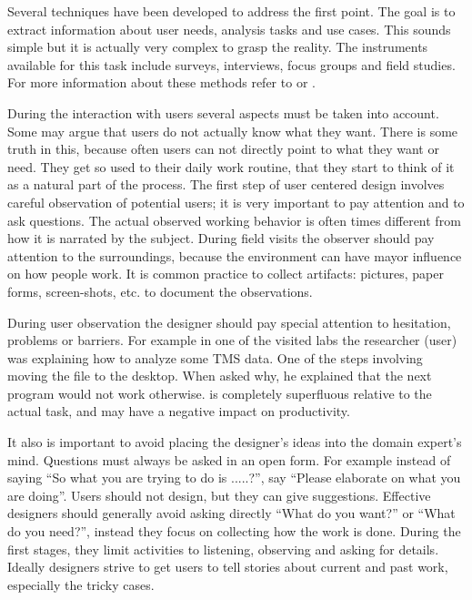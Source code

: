 Several techniques have been developed to address the first point. The goal is to extract information about user needs, analysis tasks and use cases. This sounds simple but it is actually very complex to grasp the reality. The instruments available for this task include surveys, interviews, focus groups and field studies. For more information about these methods refer to \autocite{baxter_understanding_2005} or \autocite{hartson_ux_2012}.

During the interaction with users several aspects must be taken into account.
Some may argue that users do not actually know what they want. There is some truth in this, because often users can not directly point to what they want or need. They get so used to their daily work routine, that they start to think of it as a natural part of the process. The first step of user centered design involves careful observation of potential users; it is very important to pay attention and to ask questions. The actual observed working behavior is often times different from how it is narrated by the subject. During field visits the observer should pay attention to the surroundings, because the environment can have mayor influence on how people work. It is common practice to collect artifacts: pictures, paper forms, screen-shots, etc. to document the observations.

During user observation the designer should pay special attention to hesitation, problems or barriers. For example in one of the visited labs the researcher (user) was explaining how to analyze some TMS data. One of the steps involving moving the file to the desktop. When asked  why, he explained that the next program would not work otherwise. is completely superfluous relative to the actual task, and may have a negative impact on productivity.

It also is important to avoid placing the designer's ideas into the domain expert's mind. Questions must always be asked in an open form. For example instead of saying ``So what you are trying to do is .....?'', say ``Please elaborate on what you are doing''. Users should not design, but they can give suggestions. Effective designers should generally avoid asking directly ``What do you want?'' or ``What do you need?'', instead they focus on collecting how the work is done. During the first stages, they limit activities to listening, observing and asking for details. Ideally designers strive to get users to tell stories about current and past work, especially the tricky cases.

